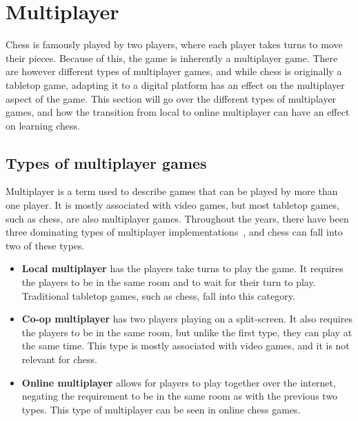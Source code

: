 \section{Multiplayer}\label{sec:multiplayer-analysis}

Chess is famously played by two players, where each player takes turns to move their pieces.
Because of this, the game is inherently a multiplayer game.
There are however different types of multiplayer games, and while chess is originally a tabletop game, adapting it to a
digital platform has an effect on the multiplayer aspect of the game.
This section will go over the different types of multiplayer games, and how the transition from local to online
multiplayer can have an effect on learning chess.

\subsection{Types of multiplayer games}\label{subsec:types-of-multiplayer-games}

Multiplayer is a term used to describe games that can be played by more than one player.
It is mostly associated with video games, but most tabletop games, such as chess, are also multiplayer games.
Throughout the years, there have been three dominating types of multiplayer implementations~\cite{multiplayer-types},
and chess can fall into two of these types.

\begin{itemize}

    \item \textbf{Local multiplayer} has the players take turns to play the game.
    It requires the players to be in the same room and to wait for their turn to play.
    Traditional tabletop games, such as chess, fall into this category.

    \item \textbf{Co-op multiplayer} has two players playing on a split-screen.
    It also requires the players to be in the same room, but unlike the first type, they can play at the same time.
    This type is mostly associated with video games, and it is not relevant for chess.

    \item \textbf{Online multiplayer} allows for players to play together over the internet, negating the requirement to
    be in the same room as with the previous two types.
    This type of multiplayer can be seen in online chess games.

\end{itemize}

